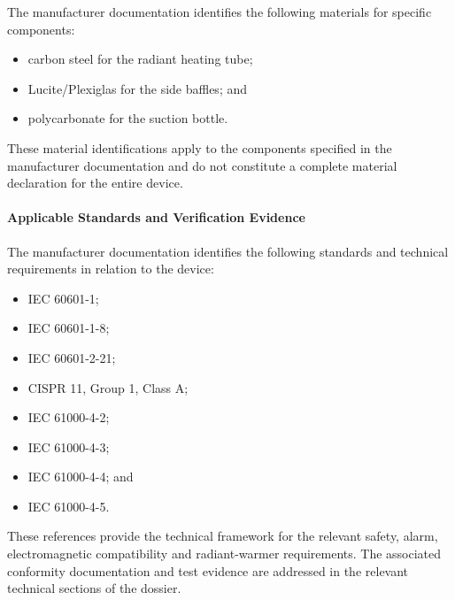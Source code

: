 The manufacturer documentation identifies the following
materials for specific components:

\begin{itemize}
    \item carbon steel for the radiant heating tube;
    \item Lucite/Plexiglas for the side baffles; and
    \item polycarbonate for the suction bottle.
\end{itemize}

These material identifications apply to the components
specified in the manufacturer documentation and do not
constitute a complete material declaration for the entire
device.


\paragraph{Applicable Standards and Verification Evidence}

The manufacturer documentation identifies the following
standards and technical requirements in relation to the device:

\begin{itemize}
    \item IEC 60601-1;
    \item IEC 60601-1-8;
    \item IEC 60601-2-21;
    \item CISPR 11, Group 1, Class A;
    \item IEC 61000-4-2;
    \item IEC 61000-4-3;
    \item IEC 61000-4-4; and
    \item IEC 61000-4-5.
\end{itemize}

These references provide the technical framework for the
relevant safety, alarm, electromagnetic compatibility and
radiant-warmer requirements. The associated conformity
documentation and test evidence are addressed in the relevant
technical sections of the dossier.

